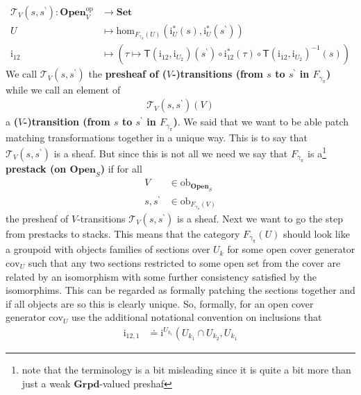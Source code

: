 \begin{exa}
\begin{align*}
  \mathcal{T}_{V}(s,s^{\backprime})
  \colon
  \mathbf{Open}_{V}^{\mathrm{op}}
  &\rightarrow
  \mathbf{Set}
  \\
  U
  &\mapsto
  \mathrm{hom}_{F_{\gamma_{\pi}}(U)}
  \left(
    \mathrm{i}_{U}^{\ast}(s),
    \mathrm{i}_{U}^{\ast}(s^{\backprime})
  \right)
  \\
  \mathrm{i}_{12}
  &\mapsto
  \left(
    \tau
    \mapsto
    \mathsf{T}(\mathrm{i}_{12},\mathrm{i}_{U_{2}})(s^{\backprime})
    \circ
    \mathrm{i}_{12}^{\ast}(\tau)
    \circ
    \mathsf{T}(\mathrm{i}_{12},\mathrm{i}_{U_{2}})^{-1}(s)
  \right)
\end{align*}
We call $\mathcal{T}_{V}(s,s^{\backprime})$ the \textbf{presheaf of ($V$-)transitions (from $s$ to $s^{\backprime}$ in $F_{\gamma_{\pi}}$)} while we call an element of
\begin{align*}
  \mathcal{T}_{V}(s,s^{\backprime})(V)
\end{align*}
a \textbf{($V$-)transition (from $s$ to $s^{\backprime}$ in $F_{\gamma_{\pi}}$)}. We said that we want to be able patch matching transformations together in a unique way. This is to say that $\mathcal{T}_{V}(s,s^{\backprime})$ is a sheaf. But since this is not all we need we say that $F_{\gamma_{\pi}}$ is a\footnote{note that the terminology is a bit misleading since it is quite a bit more than just a {\glqq}weak $\mathbf{Grpd}$-valued preshaf{\grqq}} \textbf{prestack (on $\mathbf{Open}_{S}$)} if for all
\begin{align*}
  V
  &\in
  \mathrm{ob}_{\mathbf{Open}_{S}}
  \\
  s,
  s^{\backprime}
  &\in
  \mathrm{ob}_{F_{\gamma_{\pi}}(V)}
\end{align*}
the presheaf of $V$-transitions $\mathcal{T}_{V}(s,s^{\backprime})$ is a sheaf. Next we want to go the step from prestacks to stacks. This means that the category $F_{\gamma_{\pi}}(U)$ should look like a groupoid with objects families of sections over $U_{k}$ for some open cover generator $\mathrm{cov}_{U}$ such that any two sections restricted to some open set from the cover are related by an isomorphism with some further consistency satisfied by the isomorphims. This can be regarded as formally patching the sections together and if all objects are so this is clearly unique. So, formally, for an open cover generator $\mathrm{cov}_{U}$ use the additional notational convention on inclusions that
\begin{align*}
  \mathrm{i}_{12,1}
  &\doteq
  \mathrm{i}^{U_{k_{1}}}
  \left(
    U_{k_{1}}
    \cap
    U_{k_{2}},
    U_{k_{1}}

\end{align*}
\end{exa}
